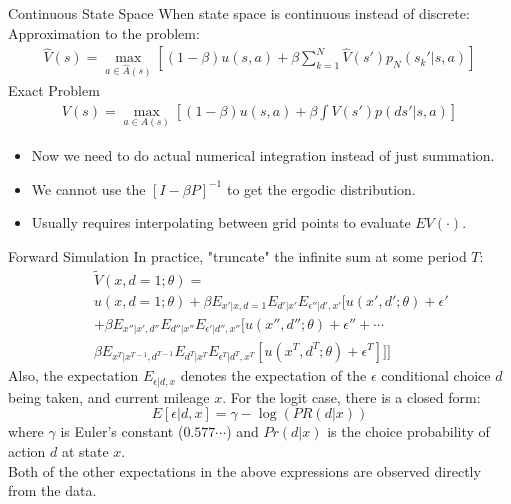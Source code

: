 \documentclass[xcolor=pdftex,dvipsnames,table,mathserif]{beamer}
\begin{document}
\begin{frame}{Continuous State Space}
When state space is continuous instead of discrete:\\
Approximation to the problem:
\begin{eqnarray*}
\hat{V}(s) = \max_{a \in \hat{A}(s)} \left[ (1-\beta) u(s,a) + \beta \sum_{k=1}^N \hat{V}(s')p_N (s_k' | s,a) \right]
\end{eqnarray*}
Exact Problem
\begin{eqnarray*}
V(s) = \max_{a \in A(s)} \left[ (1-\beta) u(s,a) + \beta \int V(s')p(ds' | s,a) \right]
\end{eqnarray*}
\begin{itemize}
\item Now we need to do actual numerical integration instead of just summation.
\item We cannot use the $[I- \beta P]^{-1}$ to get the ergodic distribution.
\item Usually requires interpolating between grid points to evaluate $EV(\cdot)$.
\end{itemize}
\end{frame}


\begin{frame}{Forward Simulation}
In practice, "truncate" the infinite sum at some period $T$: 
\begin{eqnarray*} 
&& \tilde V(x, d=1;\theta) =\\
&& u(x, d=1; \theta) + \beta E_{x'|x, d=1} E_{d'|x'} E_{\epsilon''|d', x'} [u(x', d';\theta) + \epsilon' \\
&& + \beta E_{x''|x', d''} E_{d''|x''} E_{\epsilon'|d'', x''} [u(x'', d'';\theta) + \epsilon'' + \cdots \\
&& \beta E_{x^T|x^{T-1}, d^{T-1}} E_{d^T|x^T} E_{\epsilon^T|d^T, x^T} [u(x^T, d^T;\theta) + \epsilon^T ]]]
\end{eqnarray*}
Also, the expectation $E_{\epsilon|d, x}$ denotes the expectation of the $\epsilon$ conditional choice $d$ being taken, and current mileage $x$. For the logit case, there is a closed form:
$$ E[\epsilon | d, x] = \gamma - \log(PR(d|x))$$
where $\gamma$ is Euler's constant ($0.577\cdots$) and $Pr(d|x)$ is the choice probability of action $d$ at state $x$. \\
\vspace{2mm}
Both of the other expectations in the above expressions are observed directly from the data. 
\end{frame}
\end{document}
